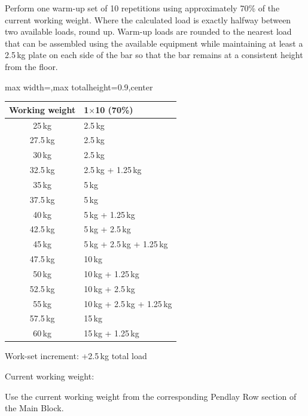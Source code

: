 \documentclass[11pt,a4paper]{article}
\newcommand{\tablearraystretch}{1.15}
\begin{document}
Perform one warm-up set of 10 repetitions using approximately 70\% of the current working weight. Where the calculated load is exactly halfway between two available loads, round up. Warm-up loads are rounded to the nearest load that can be assembled using the available equipment while maintaining at least a 2.5\,kg plate on each side of the bar so that the bar remains at a consistent height from the floor.

\begin{center}
\renewcommand{\arraystretch}{\tablearraystretch}
\begin{adjustbox}{max width=\linewidth,max totalheight=0.9\textheight,center}
\begin{tabular}{c p{5cm}}
\toprule
Working weight & 1$\times$10 (70\%) \\
\midrule
25\,kg   & 2.5\,kg \\
27.5\,kg & 2.5\,kg \\
30\,kg   & 2.5\,kg \\
32.5\,kg & 2.5\,kg + 1.25\,kg \\
35\,kg   & 5\,kg \\
37.5\,kg & 5\,kg \\
40\,kg   & 5\,kg + 1.25\,kg \\
42.5\,kg & 5\,kg + 2.5\,kg \\
45\,kg   & 5\,kg + 2.5\,kg + 1.25\,kg \\
47.5\,kg & 10\,kg \\
50\,kg   & 10\,kg + 1.25\,kg \\
52.5\,kg & 10\,kg + 2.5\,kg \\
55\,kg   & 10\,kg + 2.5\,kg + 1.25\,kg \\
57.5\,kg & 15\,kg \\
60\,kg   & 15\,kg + 1.25\,kg \\
\bottomrule
\end{tabular}
\end{adjustbox}
\renewcommand{\arraystretch}{1}
\end{center}

Work-set increment: +2.5\,kg total load

Current working weight:

Use the current working weight from the corresponding Pendlay Row section of the Main Block.
\end{document}
